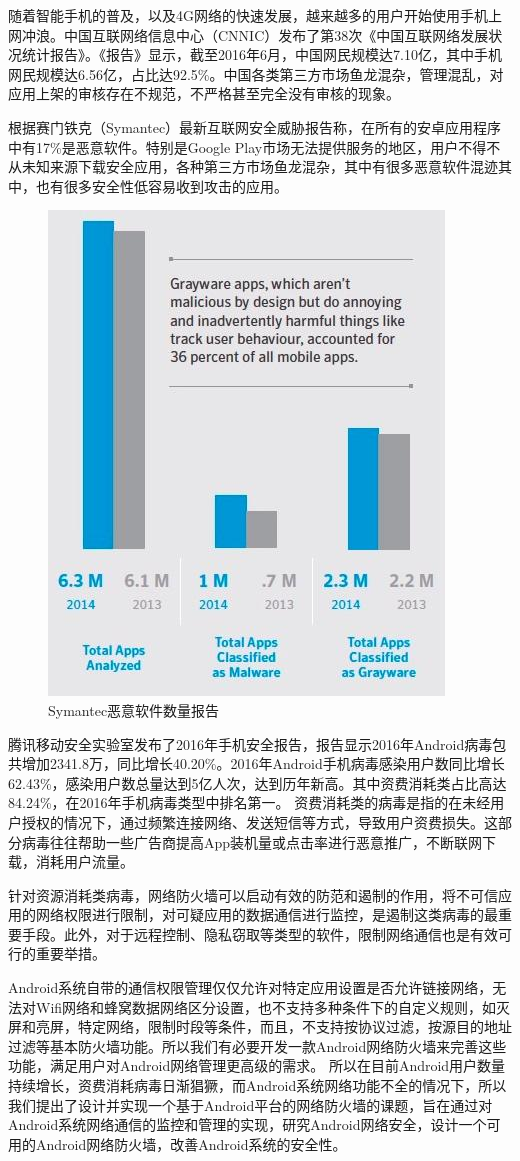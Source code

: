 \documentclass[format=final, language=chinese, degree=fyp]{hustthesis}
\begin{document}
随着智能手机的普及，以及4G网络的快速发展，越来越多的用户开始使用手机上网冲浪。中国互联网络信息中心（CNNIC）发布了第38次《中国互联网络发展状况统计报告》。《报告》显示，截至2016年6月，中国网民规模达7.10亿，其中手机网民规模达6.56亿，占比达92.5\%。中国各类第三方市场鱼龙混杂，管理混乱，对应用上架的审核存在不规范，不严格甚至完全没有审核的现象。

根据赛门铁克（Symantec）最新互联网安全威胁报告称，在所有的安卓应用程序中有17\%是恶意软件。特别是Google Play市场无法提供服务的地区，用户不得不从未知来源下载安全应用，各种第三方市场鱼龙混杂，其中有很多恶意软件混迹其中，也有很多安全性低容易收到攻击的应用。

\begin{figure}[h!]
\centering
\includegraphics[width=.4\textwidth]{symantec_report}
\caption{Symantec恶意软件数量报告}\label{fig:2}
\end{figure}

腾讯移动安全实验室发布了2016年手机安全报告，报告显示2016年Android病毒包共增加2341.8万，同比增长40.20\%。2016年Android手机病毒感染用户数同比增长62.43\%，感染用户数总量达到5亿人次，达到历年新高。其中资费消耗类占比高达84.24\%，在2016年手机病毒类型中排名第一。
资费消耗类的病毒是指的在未经用户授权的情况下，通过频繁连接网络、发送短信等方式，导致用户资费损失。这部分病毒往往帮助一些广告商提高App装机量或点击率进行恶意推广，不断联网下载，消耗用户流量。

针对资源消耗类病毒，网络防火墙可以启动有效的防范和遏制的作用，将不可信应用的网络权限进行限制，对可疑应用的数据通信进行监控，是遏制这类病毒的最重要手段。此外，对于远程控制、隐私窃取等类型的软件，限制网络通信也是有效可行的重要举措。

Android系统自带的通信权限管理仅仅允许对特定应用设置是否允许链接网络，无法对Wifi网络和蜂窝数据网络区分设置，也不支持多种条件下的自定义规则，如灭屏和亮屏，特定网络，限制时段等条件，而且，不支持按协议过滤，按源目的地址过滤等基本防火墙功能。所以我们有必要开发一款Android网络防火墙来完善这些功能，满足用户对Android网络管理更高级的需求。
所以在目前Android用户数量持续增长，资费消耗病毒日渐猖獗，而Android系统网络功能不全的情况下，所以我们提出了设计并实现一个基于Android平台的网络防火墙的课题，旨在通过对Android系统网络通信的监控和管理的实现，研究Android网络安全，设计一个可用的Android网络防火墙，改善Android系统的安全性。
\end{document}
